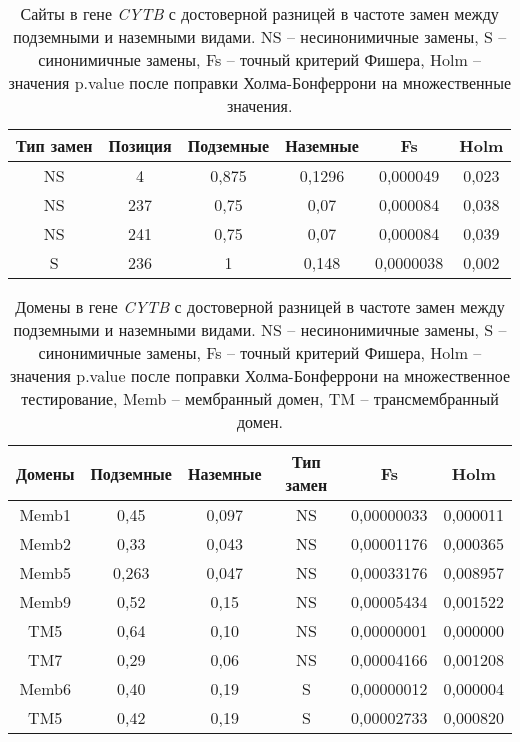 \begin{table}[h!]
\caption{Сайты в гене \textit{CYTB} с достоверной разницей в частоте замен между подземными и наземными видами. NS -- несинонимичные замены, S -- синонимичные замены, Fs -- точный критерий Фишера, Holm -- значения p.value после поправки Холма-Бонферрони на множественные значения.}
\label{CytB_sites}
\vspace{5mm}

\begin{center}
\begin{tabular}{|c|c|c|c|c|c|}
	\hline 
\textbf{Тип замен} & \textbf{Позиция} & \textbf{Подземные} & \textbf{Наземные} & \textbf{Fs} & \textbf{Holm} \\ \hline 
NS & 4 & 0,875 & 0,1296 & 0,000049 & 0,023 \\ \hline 
NS & 237 & 0,75 & 0,07 & 0,000084 & 0,038 \\ \hline 
NS & 241 & 0,75 & 0,07 & 0,000084 & 0,039 \\ \hline 
S & 236 & 1 & 0,148 & 0,0000038 & 0,002 \\ \hline 
\end{tabular} 
\end{center}
\end{table}



\begin{table}[h!]
	\caption{Домены в гене \textit{CYTB} с достоверной разницей в частоте замен между подземными и наземными видами. NS -- несинонимичные замены, S -- синонимичные замены, Fs -- точный критерий Фишера, Holm -- значения p.value после поправки Холма-Бонферрони на множественное тестирование, Memb -- мембранный домен, TM -- трансмембранный домен.}\label{CytB_domains}
	\vspace{5mm}
\begin{center}	
	\begin{tabular}{|c|c|c|c|c|c|}
		\hline 
\textbf{Домены} & \textbf{Подземные} & \textbf{Наземные} & \textbf{Тип замен} & \textbf{Fs} & \textbf{Holm}\\ \hline 
Memb1 & 0,45 & 0,097 & NS & 0,00000033 & 0,000011\\ \hline 
Memb2 & 0,33 & 0,043 & NS & 0,00001176 & 0,000365\\ \hline 
Memb5 & 0,263 & 0,047 & NS & 0,00033176 & 0,008957\\ \hline 
Memb9 & 0,52 & 0,15 & NS & 0,00005434 & 0,001522\\ \hline 
TM5 & 0,64 & 0,10 & NS & 0,00000001 & 0,000000\\ \hline 
TM7 & 0,29 & 0,06 & NS & 0,00004166 & 0,001208\\ \hline 
Memb6 & 0,40 & 0,19 & S & 0,00000012 & 0,000004\\ \hline 
TM5 & 0,42 & 0,19 & S & 0,00002733 & 0,000820 \\ \hline
	\end{tabular} 
\end{center}
	
\end{table}

